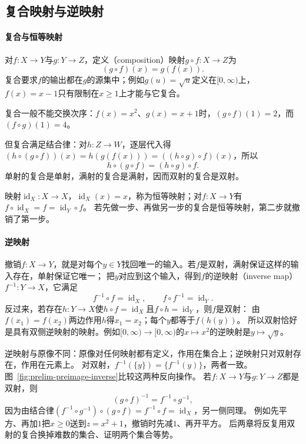 \subsection{复合映射与逆映射}
\label{sec:prelim-map-operations}

\paragraph{复合与恒等映射}
对$f:X\to Y$与$g:Y\to Z$，定义（composition）映射$g\circ f:X\to Z$为
\[
 (g\circ f)(x)=g(f(x)).
\]
复合要求$f$的输出都在$g$的源集中；例如$g(u)=\sqrt u$定义在$[0,\infty)$上，$f(x)=x-1$只有限制在$x\geq1$上才能与它复合。

复合一般不能交换次序：$f(x)=x^2$、$g(x)=x+1$时，$(g\circ f)(1)=2$，而$(f\circ g)(1)=4$。

但复合满足结合律：对$h:Z\to W$，逐层代入得$(h\circ(g\circ f))(x)=h(g(f(x)))=((h\circ g)\circ f)(x)$，所以
\[
 h\circ(g\circ f)=(h\circ g)\circ f.
\]
单射的复合是单射，满射的复合是满射，因而双射的复合是双射。

映射$\operatorname{id}_X:X\to X$，$\operatorname{id}_X(x)=x$，称为恒等映射；对$f:X\to Y$有$f\circ\operatorname{id}_X=f=\operatorname{id}_Y\circ f$。
若先做一步、再做另一步的复合是恒等映射，第二步就撤销了第一步。

\paragraph{逆映射}
\label{def:prelim-invertible-map}
撤销$f:X\to Y$，就是对每个$y\in Y$找回唯一的输入。若$f$是双射，满射保证这样的输入存在，单射保证它唯一；
把$y$对应到这个输入，得到$f$的逆映射（inverse map）$f^{-1}:Y\to X$，它满足
\[
 f^{-1}\circ f=\operatorname{id}_X,\qquad f\circ f^{-1}=\operatorname{id}_Y.
\]
反过来，若存在$h:Y\to X$使$h\circ f=\operatorname{id}_X$且$f\circ h=\operatorname{id}_Y$，则$f$是双射：
由$f(x_1)=f(x_2)$两边作用$h$得$x_1=x_2$；每个$y$都等于$f(h(y))$。
所以双射恰好是具有双侧逆映射的映射。例如$[0,\infty)\to[0,\infty)$的$x\mapsto x^2$的逆映射是$y\mapsto\sqrt y$。

逆映射与原像不同：原像对任何映射都有定义，作用在集合上；逆映射只对双射存在，作用在元素上。
对双射，$f^{-1}(\{y\})=\{f^{-1}(y)\}$，两者一致。图~\ref{fig:prelim-preimage-inverse}比较这两种反向操作。
若$f:X\to Y$与$g:Y\to Z$都是双射，则
\begin{equation}
 (g\circ f)^{-1}=f^{-1}\circ g^{-1},
 \label{eq:prelim-inverse-composition}
\end{equation}
因为由结合律$(f^{-1}\circ g^{-1})\circ(g\circ f)=f^{-1}\circ f=\operatorname{id}_X$，另一侧同理。
例如先平方、再加$1$把$x\geq0$送到$z=x^2+1$，撤销时先减$1$、再开平方。
后两章将反复用双射的复合换掉难数的集合、证明两个集合等势。

